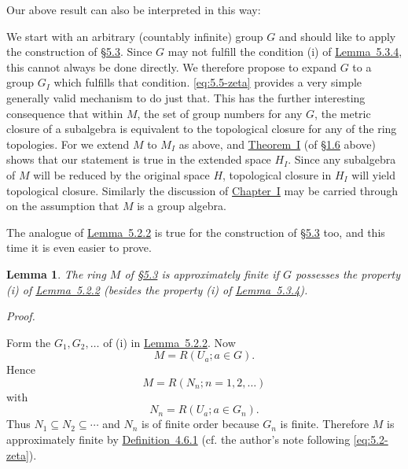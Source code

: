 \documentclass[b5paper,twoside]{article}
\newcommand{\secref}[2]{\hyperref[#1]{\mbox{\S#2}}}
\newcommand{\chapterref}[2]{\hyperref[#1]{\mbox{Chapter~#2}}}
\newcommand{\thmref}[2]{\hyperref[#1]{\mbox{Theorem~#2}}}
\newcommand{\lemref}[2]{\hyperref[#1]{\mbox{Lemma~#2}}}
\newcommand{\defref}[2]{\hyperref[#1]{\mbox{Definition~#2}}}
\theoremstyle{mvnplain}
\newtheorem{lemma}{Lemma}[section]
\renewenvironment{proof}[1][Proof]{%
  \par\addvspace{0.35\baselineskip}%
  \noindent\textit{#1.}\ \normalfont\ignorespaces
}{%
  \par\addvspace{0.35\baselineskip}%
}
\newcommand{\M}{\mathbf M}
\newcommand{\N}{\mathbf N}
\newcommand{\R}{\mathbf R}
\newcommand{\Hilbert}{\mathfrak H}
\def\M{M}%
\def\N{N}%
\def\R{R}%
\def\Hilbert{H}%
\def\mathfrak#1{#1}%
\begin{document}
Our above result can also be interpreted in this way:

We start with an arbitrary (countably infinite) group \(\mathfrak G\) and
should like to apply the construction of \secref{sec:5.3}{5.3}. Since
\(\mathfrak G\) may not fulfill the condition (i) of
\lemref{lem:5.3.4}{5.3.4}, this cannot always be done directly. We therefore
propose to expand \(\mathfrak G\) to a group \(\mathfrak G_I\) which fulfills
that condition. \eqref{eq:5.5-zeta} provides a very simple generally valid
mechanism to do just that. This has the further interesting consequence that
within \(\M\), the set of group numbers for any \(\mathfrak G\), the metric
closure of a subalgebra is equivalent to the topological closure for any of the
ring topologies. For we extend \(\M\) to \(\M_I\) as above, and
\thmref{thm:I}{I} (of \secref{sec:1.6}{1.6} above) shows that our statement
is true in the extended space \(\Hilbert_I\). Since any subalgebra of \(\M\)
will be reduced by the original space \(\Hilbert\), topological closure in
\(\Hilbert_I\) will yield topological closure. Similarly the discussion of
\chapterref{chapter:I}{I} may be carried through on the assumption that
\(\M\) is a group
algebra.

The analogue of \lemref{lem:5.2.2}{5.2.2} is true for the construction of
\secref{sec:5.3}{5.3} too, and this time it is even easier to prove.

\begin{lemma}\label{lem:5.6.1}
The ring \(\M\) of \secref{sec:5.3}{5.3} is approximately finite if
\(\mathfrak G\) possesses the property (i) of \lemref{lem:5.2.2}{5.2.2}
(besides the property (i) of \lemref{lem:5.3.4}{5.3.4}).
\end{lemma}

\begin{proof}
Form the \(\mathfrak G_1,\mathfrak G_2,\ldots\) of (i) in
\lemref{lem:5.2.2}{5.2.2}. Now
\[
 \M=\R(U_a;a\in\mathfrak G).
\]
Hence
\[
 \M=\R(\N_n;n=1,2,\ldots)
\]
with
\[
 \N_n=\R(U_a;a\in\mathfrak G_n).
\]
Thus \(\N_1\subseteq\N_2\subseteq\cdots\) and \(\N_n\) is of finite order
because \(\mathfrak G_n\) is finite. Therefore \(\M\) is approximately finite
by \defref{def:4.6.1}{4.6.1} (cf. the author's note following
\eqref{eq:5.2-zeta}).
\end{proof}
\end{document}
